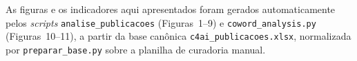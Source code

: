 \documentclass[12pt,a4paper]{article}
\begin{document}
\noindent
As figuras e os indicadores aqui apresentados foram gerados automaticamente pelos
\emph{scripts} \texttt{analise\_publicacoes} (Figuras~1--9) e
\texttt{coword\_analysis.py} (Figuras~10--11), a partir da base canônica
\texttt{c4ai\_publicacoes.xlsx}, normalizada por \texttt{preparar\_base.py} sobre
a planilha de curadoria manual.
\end{document}
